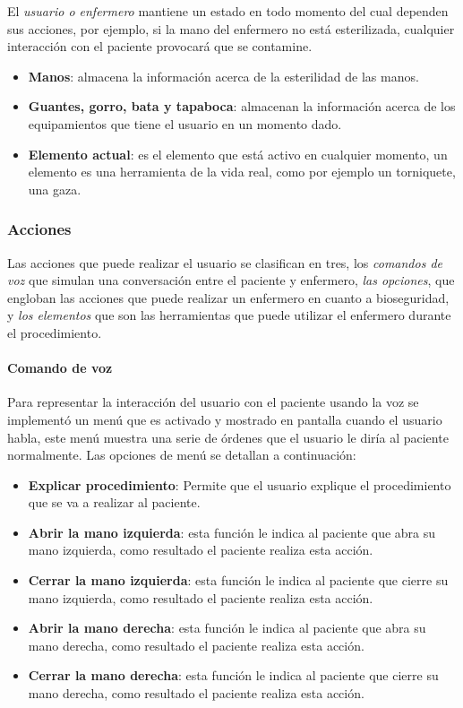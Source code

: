 El \emph{usuario o enfermero} mantiene un estado en todo momento del cual
dependen sus acciones, por ejemplo, si la mano del enfermero no está
esterilizada, cualquier interacción con el paciente provocará que se
contamine.

\begin{itemize}
    \item \textbf{Manos}: almacena la información acerca de la esterilidad de
        las manos.
    \item \textbf{Guantes, gorro, bata y tapaboca}: almacenan la información
        acerca de los equipamientos que tiene el usuario en un momento dado.
    \item \textbf{Elemento actual}: es el elemento que está activo en
        cualquier momento, un elemento es una herramienta de la vida real,
        como por ejemplo un torniquete, una gaza.
\end{itemize}

\subsubsection{Acciones}

Las acciones que puede realizar el usuario se clasifican en tres, los
\emph{comandos de voz} que simulan una conversación entre el paciente y
enfermero, \emph{las opciones}, que engloban las acciones que puede realizar un
enfermero en cuanto a bioseguridad, y \emph{los elementos} que son las
herramientas que puede utilizar el enfermero durante el procedimiento.

\paragraph{Comando de voz}

Para representar la interacción del usuario con el paciente usando la voz se
implementó un menú que es activado y mostrado en pantalla cuando el usuario
habla, este menú muestra una serie de órdenes que el usuario le diría al
paciente normalmente. Las opciones de menú se detallan a continuación:

\begin{itemize}
    \item \textbf{Explicar procedimiento}: Permite que el usuario explique el
        procedimiento que se va a realizar al paciente. 
\item \textbf{Abrir la mano izquierda}: esta función le indica al paciente que
    abra su mano izquierda, como resultado el paciente realiza esta acción.
\item \textbf{Cerrar la mano izquierda}: esta función le indica al paciente que
    cierre su mano izquierda, como resultado el paciente realiza esta acción.
\item \textbf{Abrir la mano derecha}: esta función le indica al paciente que
    abra su mano derecha, como resultado el paciente realiza esta acción.
\item \textbf{Cerrar la mano derecha}: esta función le indica al paciente que
    cierre su mano derecha, como resultado el paciente realiza esta acción.
\end{itemize}

